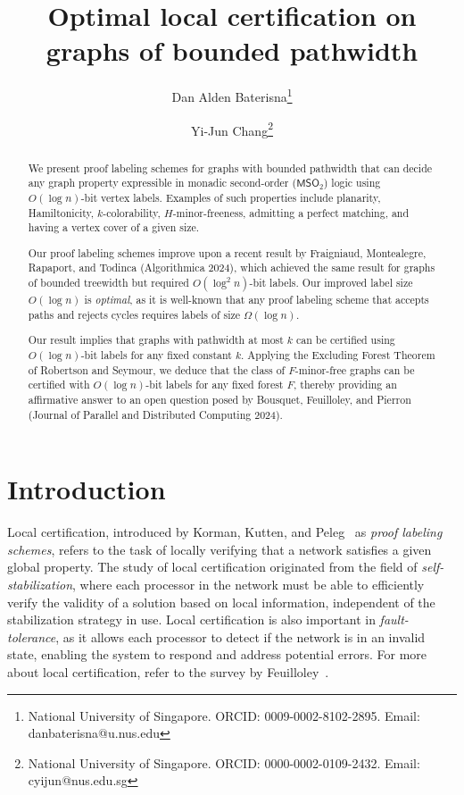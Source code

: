 \documentclass[11pt]{article}
\title{Optimal local certification on graphs of bounded pathwidth}
\author{Dan Alden Baterisna\footnote{National University of Singapore. ORCID: 0009-0002-8102-2895. Email: danbaterisna@u.nus.edu} \and Yi-Jun Chang\footnote{National University of Singapore. ORCID: 0000-0002-0109-2432. Email: cyijun@nus.edu.sg}}
\date{}
\theoremstyle{definition}
\theoremstyle{remark}
\newcommand{\MSO}{\mathsf{MSO}_2}
\begin{document}
\maketitle
\thispagestyle{empty}

\begin{abstract}
We present proof labeling schemes for graphs with bounded pathwidth that can decide any graph property expressible in monadic second-order ($\MSO$) logic using $O(\log n)$-bit vertex labels. Examples of such properties include planarity, Hamiltonicity, $k$-colorability, $H$-minor-freeness, admitting a perfect matching, and having a vertex cover of a given size.

Our proof labeling schemes improve upon a recent result by Fraigniaud, Montealegre, Rapaport, and Todinca (Algorithmica 2024), which achieved the same result for graphs of bounded treewidth but required $O(\log^2 n)$-bit labels. Our improved label size $O(\log n)$ is \emph{optimal}, as it is well-known that any proof labeling scheme that accepts paths and rejects cycles requires labels of size $\Omega(\log n)$.

Our result implies that graphs with pathwidth at most $k$ can be certified using $O(\log n)$-bit labels for any fixed constant $k$. Applying the Excluding Forest Theorem of Robertson and Seymour, we deduce that the class of $F$-minor-free graphs can be certified with $O(\log n)$-bit labels for any fixed forest $F$, thereby providing an affirmative answer to an open question posed by Bousquet, Feuilloley, and Pierron (Journal of Parallel and Distributed Computing 2024).
\end{abstract}

\newpage
\bigskip
\tableofcontents
\bigskip
\thispagestyle{empty}



\newpage
{}

\section{Introduction}\label{sect:intro}

Local certification, introduced by Korman, Kutten, and Peleg~\cite{korman03032010} as \emph{proof labeling schemes}, refers to the task of locally verifying that a network satisfies a given global property. The study of local certification originated from the field of \emph{self-stabilization}, where each processor in the network must be able to efficiently verify the validity of a solution based on local information, independent of the stabilization strategy in use. Local certification is also important in \emph{fault-tolerance}, as it allows each processor to detect if the network is in an invalid state, enabling the system to respond and address potential errors. For more about local certification, refer to the survey by Feuilloley~\cite{dmtcs:8479}.
\end{document}
